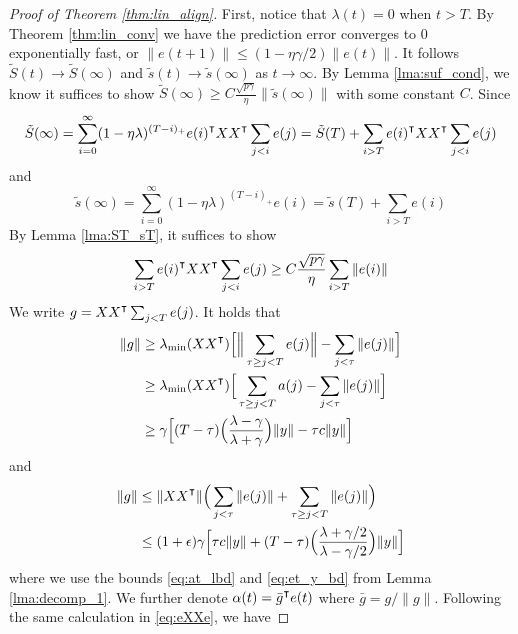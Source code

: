 \begin{proof}[Proof of Theorem \ref{thm:lin_align}]
First, notice that $\lambda(t)=0$ when $t>T$. By Theorem \ref{thm:lin_conv} we have the prediction error converges to 0 exponentially fast, or $\|e(t+1)\|\leq (1-\eta\gamma/2)\|e(t)\|$. It follows $\tilde{S}(t)\to \tilde{S}(\infty)$ and $\tilde{s}(t)\to \tilde{s}(\infty)$ as $t\to\infty$. By Lemma \ref{lma:suf_cond}, we know it suffices to show $\tilde{S}(\infty)\geq C\frac{\sqrt{p\gamma}}{\eta}\|\tilde{s}(\infty)\|$ with some constant $C$. Since 
\begin{equation*}
\tilde{S}(\infty) = \sum_{i=0}^\infty(1-\eta\lambda)^{(T-i)_+}e(i)\transpose XX\transpose \sum_{j<i} e(j) = \tilde{S}(T)+ \sum_{i>T}e(i)\transpose XX\transpose \sum_{j<i}e(j)
\end{equation*}
and 
\begin{equation*}
\tilde{s}(\infty) = \sum_{i=0}^\infty(1-\eta\lambda)^{(T-i)_+}e(i)= \tilde{s}(T)+ \sum_{i>T}e(i)
\end{equation*}
By Lemma \ref{lma:ST_sT}, it suffices to show 
\begin{equation}
\label{eq:exxe_e_bd}
    \sum_{i>T}e(i)\transpose XX\transpose \sum_{j<i}e(j) \geq C\frac{\sqrt{p\gamma}}{\eta}\sum_{i>T}\|e(i)\|
\end{equation}
We write $g = XX\transpose \sum_{j<T}e(j)$. It holds that
\begin{equation}
\label{eq:g_lbd}
\begin{aligned}
\|g\| &\geq \lambda_{\min}(XX\transpose) \Big[\Big\|\sum_{\tau\geq j<T}e(j)\Big\|-\sum_{j<\tau}\|e(j)\|\Big] \\
&\geq\lambda_{\min}(XX\transpose) \Big[\sum_{\tau\geq j<T}a(j)-\sum_{j<\tau}\|e(j)\|\Big] \\
&\geq \gamma\Big[(T-\tau)\Big(\frac{\lambda-\gamma}{\lambda+\gamma}\Big)\|y\| - \tau c\|y\|\Big]
\end{aligned}
\end{equation}
and
\begin{equation}
\label{eq:g_ubd}
\begin{aligned}
\|g\| &\leq \|XX\transpose\| \Big(\sum_{j<\tau}\|e(j)\| + \sum_{\tau\geq j<T}\|e(j)\|\Big) \\
&\leq (1+\epsilon)\gamma\Big[\tau c\|y\|+ (T-\tau)\Big(\frac{\lambda+\gamma/2}{\lambda-\gamma/2}\Big)\|y\|\Big]
\end{aligned}
\end{equation}
where we use the bounds \eqref{eq:at_lbd} and \eqref{eq:et_y_bd} from Lemma \ref{lma:decomp_1}. We further denote $\alpha(t) = \bar{g}\transpose e(t)$ where $\bar{g} = g/\|g\|$. Following the same calculation in \eqref{eq:eXXe}, we have

\end{proof}
